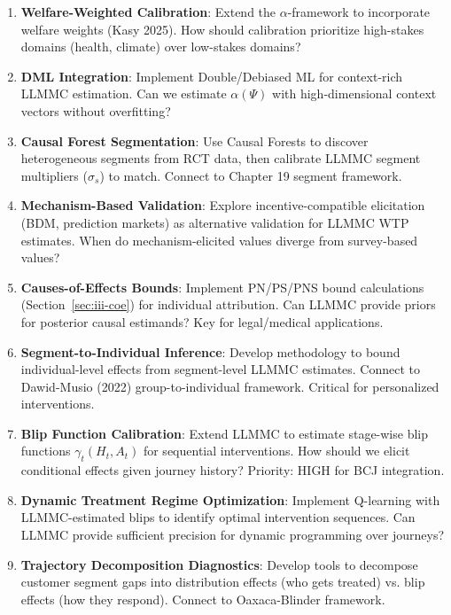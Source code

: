 \begin{enumerate}
\item \textbf{Welfare-Weighted Calibration}: Extend the $\alpha$-framework to
incorporate welfare weights (Kasy 2025). How should calibration prioritize
high-stakes domains (health, climate) over low-stakes domains?

\item \textbf{DML Integration}: Implement Double/Debiased ML for context-rich
LLMMC estimation. Can we estimate $\alpha(\Psi)$ with high-dimensional context
vectors without overfitting?

\item \textbf{Causal Forest Segmentation}: Use Causal Forests to discover
heterogeneous segments from RCT data, then calibrate LLMMC segment multipliers
($\sigma_s$) to match. Connect to Chapter 19 segment framework.

\item \textbf{Mechanism-Based Validation}: Explore incentive-compatible
elicitation (BDM, prediction markets) as alternative validation for LLMMC
WTP estimates. When do mechanism-elicited values diverge from survey-based values?

\item \textbf{Causes-of-Effects Bounds}: Implement PN/PS/PNS bound calculations
(Section~\ref{sec:iii-coe}) for individual attribution. Can LLMMC provide priors
for posterior causal estimands? Key for legal/medical applications.

\item \textbf{Segment-to-Individual Inference}: Develop methodology to bound
individual-level effects from segment-level LLMMC estimates. Connect to Dawid-Musio
(2022) group-to-individual framework. Critical for personalized interventions.

\item \textbf{Blip Function Calibration}: Extend LLMMC to estimate stage-wise blip
functions $\gamma_t(H_t, A_t)$ for sequential interventions. How should we elicit
conditional effects given journey history? Priority: HIGH for BCJ integration.

\item \textbf{Dynamic Treatment Regime Optimization}: Implement Q-learning with
LLMMC-estimated blips to identify optimal intervention sequences. Can LLMMC
provide sufficient precision for dynamic programming over journeys?

\item \textbf{Trajectory Decomposition Diagnostics}: Develop tools to decompose
customer segment gaps into distribution effects (who gets treated) vs. blip
effects (how they respond). Connect to Oaxaca-Blinder framework.


\end{enumerate}
